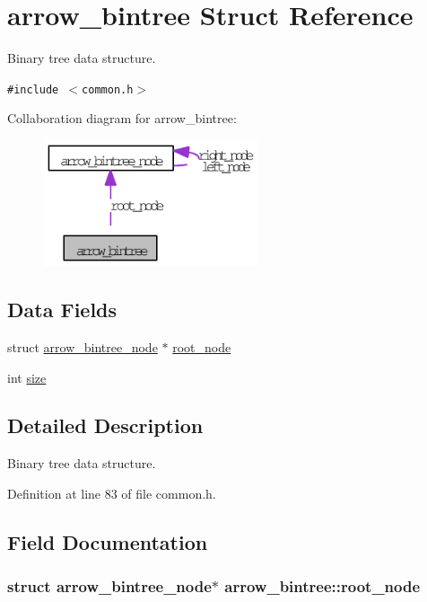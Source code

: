 \hypertarget{structarrow__bintree}{
\section{arrow\_\-bintree Struct Reference}
\label{structarrow__bintree}
}
Binary tree data structure.  


{\tt \#include $<$common.h$>$}

Collaboration diagram for arrow\_\-bintree:\nopagebreak
\begin{figure}[H]
\begin{center}
\leavevmode
\includegraphics[width=179pt]{structarrow__bintree__coll__graph}
\end{center}
\end{figure}
\subsection*{Data Fields}
\begin{CompactItemize}
\item 
struct \hyperlink{structarrow__bintree__node}{arrow\_\-bintree\_\-node} $\ast$ \hyperlink{structarrow__bintree_09f6d0bd6e32ae2c2f8df57a31388df6}{root\_\-node}
\item 
int \hyperlink{structarrow__bintree_7570628df0b5317cc8e240499ba12974}{size}
\end{CompactItemize}


\subsection{Detailed Description}
Binary tree data structure. 

Definition at line 83 of file common.h.

\subsection{Field Documentation}
\hypertarget{structarrow__bintree_09f6d0bd6e32ae2c2f8df57a31388df6}{
\subsubsection[{root\_\-node}]{\setlength{\rightskip}{0pt plus 5cm}struct {\bf arrow\_\-bintree\_\-node}$\ast$ {\bf arrow\_\-bintree::root\_\-node}}}
\label{structarrow__bintree_09f6d0bd6e32ae2c2f8df57a31388df6}


